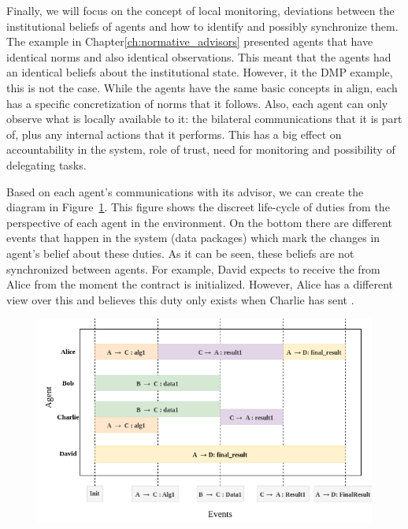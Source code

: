 Finally, we will focus on the concept of local monitoring, deviations between the institutional beliefs of agents and how to identify and possibly synchronize them. The example in Chapter\ref{ch:normative_advisors} presented agents that have identical norms and also identical observations. This meant that the agents had an identical beliefs about the institutional state. However, it the DMP example, this is not the case. While the agents have the same basic concepts in align, each has a specific concretization of norms that it follows. Also, each agent can only observe what is locally available to it: the bilateral communications that it is part of, plus any internal actions that it performs. This has a big effect on accountability in the system, role of trust, need for monitoring and possibility of delegating tasks.

Based on each agent's communications with its advisor, we can create the diagram in Figure~\ref{fig:dmp-example-duties}. This figure shows the discreet life-cycle of duties from the perspective of each agent in the environment. On the bottom there are different events that happen in the system (data packages) which mark the changes in agent's belief about these duties. As it can be seen, these beliefs are not synchronized between agents. For example, David expects to receive the  from Alice from the moment the contract is initialized. However, Alice has a different view over this and believes this duty only exists when Charlie has sent . 

   

\begin{figure}[!tbh]
\centering
\begin{minipage}[b]{.9\linewidth}
  \centering
  \includegraphics[width=\textwidth]{ch_cmf/duties.drawio.png}
  \label{fig:dmp-example-duties}
\end{minipage}
\end{figure}

